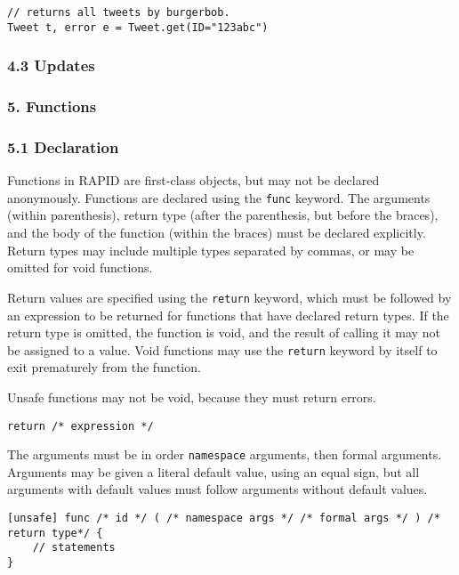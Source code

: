 \begin{verbatim}
// returns all tweets by burgerbob.
Tweet t, error e = Tweet.get(ID="123abc")
\end{verbatim}

\subsubsection*{4.3 Updates}\label{updates}

\subsubsection*{5. Functions}\label{functions-1}

\subsubsection*{5.1 Declaration}\label{declaration}

Functions in RAPID are first-class objects, but may not be declared
anonymously. Functions are declared using the \texttt{func} keyword. The
arguments (within parenthesis), return type (after the parenthesis, but
before the braces), and the body of the function (within the braces)
must be declared explicitly. Return types may include multiple types
separated by commas, or may be omitted for void functions.

Return values are specified using the \texttt{return} keyword, which
must be followed by an expression to be returned for functions that have
declared return types. If the return type is omitted, the function is
void, and the result of calling it may not be assigned to a value. Void
functions may use the \texttt{return} keyword by itself to exit
prematurely from the function.

Unsafe functions may not be void, because they must return errors.

\begin{verbatim}
return /* expression */
\end{verbatim}

The arguments must be in order \texttt{namespace} arguments, then formal
arguments. Arguments may be given a literal default value, using an
equal sign, but all arguments with default values must follow arguments
without default values.

\begin{verbatim}
[unsafe] func /* id */ ( /* namespace args */ /* formal args */ ) /* return type*/ {
    // statements
}
\end{verbatim}


